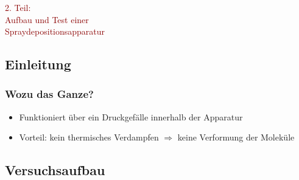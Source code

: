 \documentclass{beamer}
\begin{document}


\begin{frame}
\frametitle{}
\begin{center}
\textcolor{darkred}{\huge{2. Teil:\\ \vspace{0.65cm}
 Aufbau und Test einer\\ \vspace{0.5cm}Spraydepositionsapparatur}}
\end{center}


\end{frame}



\subsection[Motivation]{Einleitung}

\begin{frame}
\frametitle{Wozu das Ganze?}
\begin{itemize}\setlength{\itemsep}{+15pt}
  \item Funktioniert über ein Druckgefälle innerhalb der Apparatur
  \item Vorteil: kein thermisches Verdampfen $\Rightarrow$ keine Verformung der Moleküle
\end{itemize}
\end{frame}



\subsection[Versuchsaufbau]{Versuchsaufbau}
\end{document}
